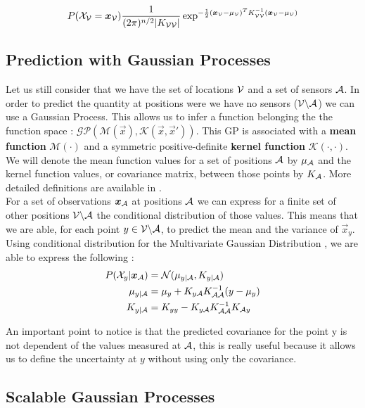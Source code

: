 \begin{equation}
    P(\mathcal{X}_{\mathcal{V}} = {\boldsymbol{{x}}}_{\mathcal{V}}) \frac{1}{(2\pi)^{n/2} |K_{\mathcal{V}\mathcal{V}}|} \exp^{-\frac{1}{2}({\boldsymbol{{x}}}_{\mathcal{V}} - \mu_{\mathcal{V}})^T K_{\mathcal{V}\mathcal{V}}^{-1} ({\boldsymbol{{x}}}_{\mathcal{V}} - \mu_{\mathcal{V}})}
\end{equation}


\subsection{Prediction with Gaussian Processes}
Let us still consider that we have the set of locations $\mathcal{V}$ and a set of sensors $\mathcal{A}$. In order to predict the quantity at positions were we have no sensors ($\mathcal{V} \backslash \mathcal{A} $) we can use a Gaussian Process. This allows us to infer a function belonging the the function space : $\mathcal{GP}(\mathcal{M}(\vec{x}), \mathcal{K}(\vec{x},\vec{x}'))$.  This GP is associated with a \textbf{mean function} $\mathcal{M}(\cdot)$ and a symmetric positive-definite \textbf{kernel function} $\mathcal{K}(\cdot,\cdot)$. We will denote the mean function values for a set of positions $\mathcal{A}$ by $\mu_{\mathcal{A}}$ and the kernel function values, or covariance matrix, between those points by $K_{\mathcal{A}}$. More detailed definitions are available in \citet[p.~13-16]{rasmussen_gaussian_2006}. \\

For a set of observations ${\boldsymbol{{x}}}_{\mathcal{A}}$ at positions $\mathcal{A}$ we can express for a finite set of other positions $\mathcal{V} \backslash \mathcal{A} $ the conditional distribution of those values. This means that we are able, for each point $y \in \mathcal{V} \backslash \mathcal{A} $, to predict the mean and the variance of $\vec{x}_y$. Using conditional distribution for the Multivariate Gaussian Distribution \citep[p.~193]{deisenroth_mathematics_2018}, we are able to express the following : 
\begin{align}
    P(\mathcal{X}_y | {\boldsymbol{{x}}}_{\mathcal{A}} ) &= \mathcal{N}(\mu_{y | \mathcal{A}}, K_{y | \mathcal{A}}) \\
    \mu_{y | \mathcal{A}} &= \mu_y + K_{y\mathcal{A}} K_{\mathcal{A}\mathcal{A}}^{-1} (y - \mu_y)\\ 
    K_{y | \mathcal{A}} &=  K_{yy} - K_{y\mathcal{A}} K_{\mathcal{A}\mathcal{A}}^{-1} K_{\mathcal{A} y} \label{equ:covGP}
\end{align}

An important point to notice is that the predicted covariance for the point y is not dependent of the values measured at $\mathcal{A}$, this is really useful because it allows us to define the uncertainty at $y$ without using only the covariance. \\

\subsection{Scalable Gaussian Processes} 

